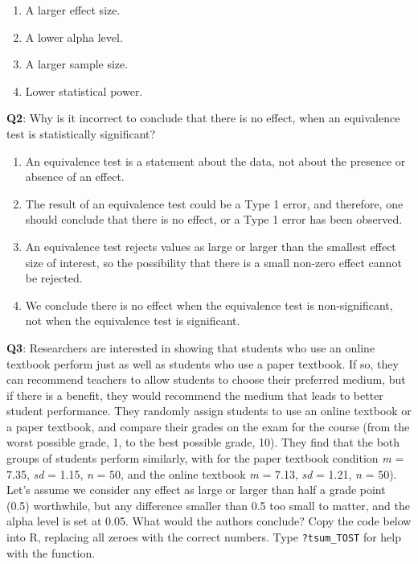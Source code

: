 \documentclass[
  oneside]{book}
\providecommand{\tightlist}{%
  \setlength{\itemsep}{0pt}\setlength{\parskip}{0pt}}
\begin{document}
\begin{enumerate}
\def\labelenumi{\Alph{enumi})}
\tightlist
\item
  A larger effect size.
\item
  A lower alpha level.
\item
  A larger sample size.
\item
  Lower statistical power.
\end{enumerate}

\textbf{Q2}: Why is it incorrect to conclude that there is no effect, when an equivalence test is statistically significant?

\begin{enumerate}
\def\labelenumi{\Alph{enumi})}
\tightlist
\item
  An equivalence test is a statement about the data, not about the presence or absence of an effect.
\item
  The result of an equivalence test could be a Type 1 error, and therefore, one should conclude that there is no effect, or a Type 1 error has been observed.\\
\item
  An equivalence test rejects values as large or larger than the smallest effect size of interest, so the possibility that there is a small non-zero effect cannot be rejected.\\
\item
  We conclude there is no effect when the equivalence test is non-significant, not when the equivalence test is significant.
\end{enumerate}

\textbf{Q3}: Researchers are interested in showing that students who use an online textbook perform just as well as students who use a paper textbook. If so, they can recommend teachers to allow students to choose their preferred medium, but if there is a benefit, they would recommend the medium that leads to better student performance. They randomly assign students to use an online textbook or a paper textbook, and compare their grades on the exam for the course (from the worst possible grade, 1, to the best possible grade, 10). They find that the both groups of students perform similarly, with for the paper textbook condition \emph{m} = 7.35, \emph{sd} = 1.15, \emph{n} = 50, and the online textbook \emph{m} = 7.13, \emph{sd} = 1.21, \emph{n} = 50). Let's assume we consider any effect as large or larger than
half a grade point (0.5) worthwhile, but any difference smaller than 0.5 too small to matter, and the alpha level is set at 0.05. What would the authors conclude? Copy the code below into R, replacing all zeroes with the correct numbers. Type \texttt{?tsum\_TOST} for help with the function.
\end{document}
